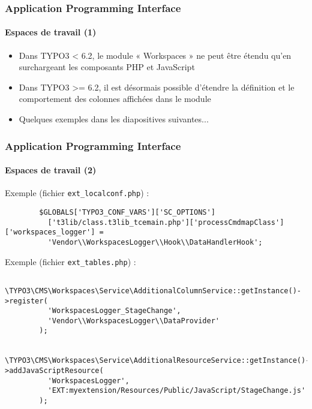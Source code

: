 
\begin{frame}[fragile]
	\frametitle{Application Programming Interface}
	\framesubtitle{Espaces de travail (1)}

	\begin{itemize}
		\item Dans TYPO3 < 6.2, le module « Workspaces » ne peut être étendu qu'en surchargeant les composants PHP et JavaScript
		\item Dans TYPO3 >= 6.2, il est désormais possible d'étendre la définition et le comportement des colonnes affichées dans le module
		\item Quelques exemples dans les diapositives suivantes...
	\end{itemize}

\end{frame}


\begin{frame}[fragile]
	\frametitle{Application Programming Interface}
	\framesubtitle{Espaces de travail (2)}

	\lstset{
		basicstyle=\tiny\ttfamily
	}

	Exemple (fichier \texttt{ext\_localconf.php}) :

	\begin{lstlisting}
		$GLOBALS['TYPO3_CONF_VARS']['SC_OPTIONS']
		  ['t3lib/class.t3lib_tcemain.php']['processCmdmapClass']['workspaces_logger'] =
		  'Vendor\\WorkspacesLogger\\Hook\\DataHandlerHook';
	\end{lstlisting}

	Exemple (fichier \texttt{ext\_tables.php}) :

	\begin{lstlisting}
		\TYPO3\CMS\Workspaces\Service\AdditionalColumnService::getInstance()->register(
		  'WorkspacesLogger_StageChange',
		  'Vendor\\WorkspacesLogger\\DataProvider'
		);

		\TYPO3\CMS\Workspaces\Service\AdditionalResourceService::getInstance()->addJavaScriptResource(
		  'WorkspacesLogger',
		  'EXT:myextension/Resources/Public/JavaScript/StageChange.js'
		);
	\end{lstlisting}

\end{frame}

